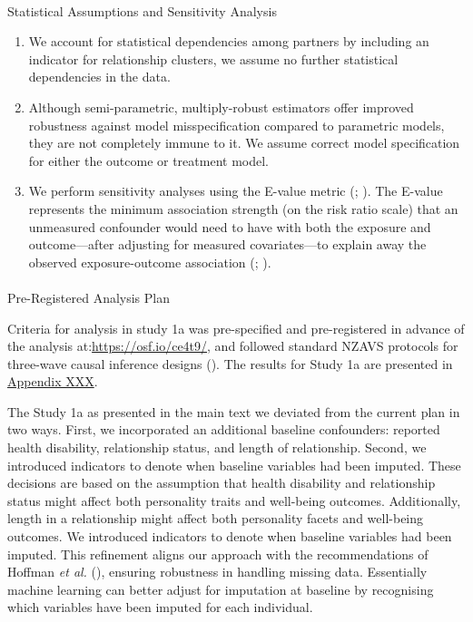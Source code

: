 \documentclass[
  single column]{article}
\makeatletter
\let\oldparagraph\paragraph
\renewcommand{\paragraph}{
    \@ifstar
      \xxxParagraphStar
      \xxxParagraphNoStar
  }
\newcommand{\xxxParagraphStar}[1]{\oldparagraph*{#1}\mbox{}}
\newcommand{\xxxParagraphNoStar}[1]{\oldparagraph{#1}\mbox{}}
\providecommand{\tightlist}{%
  \setlength{\itemsep}{0pt}\setlength{\parskip}{0pt}}\usepackage{longtable,booktabs,array}
\makeatother
\begin{document}
\paragraph{Statistical Assumptions and Sensitivity
Analysis}\label{statistical-assumptions-and-sensitivity-analysis}

\begin{enumerate}
\def\labelenumi{\arabic{enumi}.}
\tightlist
\item
  We account for statistical dependencies among partners by including an
  indicator for relationship clusters, we assume no further statistical
  dependencies in the data.
\item
  Although semi-parametric, multiply-robust estimators offer improved
  robustness against model misspecification compared to parametric
  models, they are not completely immune to it. We assume correct model
  specification for either the outcome or treatment model.
\item
  We perform sensitivity analyses using the E-value metric
  (;
  ). The
  E-value represents the minimum association strength (on the risk ratio
  scale) that an unmeasured confounder would need to have with both the
  exposure and outcome---after adjusting for measured covariates---to
  explain away the observed exposure-outcome association
  (;
  ).
\end{enumerate}

\paragraph{Pre-Registered Analysis
Plan}\label{pre-registered-analysis-plan}

Criteria for analysis in study 1a was pre-specified and pre-registered
in advance of the analysis at:\url{https://osf.io/ce4t9/}, and followed
standard NZAVS protocols for three-wave causal inference designs
(). The results for
Study 1a are presented in \href{appendix-XXX}{Appendix XXX}.

The Study 1a as presented in the main text we deviated from the current
plan in two ways. First, we incorporated an additional baseline
confounders: reported health disability, relationship status, and length
of relationship. Second, we introduced indicators to denote when
baseline variables had been imputed. These decisions are based on the
assumption that health disability and relationship status might affect
both personality traits and well-being outcomes. Additionally, length in
a relationship might affect both personality facets and well-being
outcomes. We introduced indicators to denote when baseline variables had
been imputed. This refinement aligns our approach with the
recommendations of Hoffman \emph{et al.}
(), ensuring robustness in handling
missing data. Essentially machine learning can better adjust for
imputation at baseline by recognising which variables have been imputed
for each individual.
\end{document}
